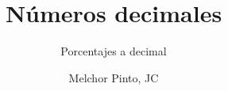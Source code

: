 \documentclass{guia}
\title{Números decimales}
\subtitle{Porcentajes a decimal}
\author{Melchor Pinto, JC}
\begin{document}
%
\begin{questions}
\questionboxed{}
\end{questions}
\end{document}
